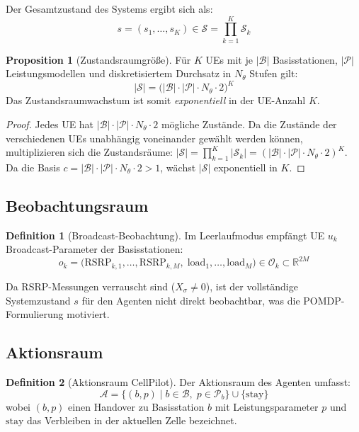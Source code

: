 ﻿\documentclass[a4paper,12pt]{article}
\theoremstyle{definition}
\newtheorem{definition}{Definition}
\newtheorem{proposition}{Proposition}
\begin{document}
Der Gesamtzustand des Systems ergibt sich als:
\[
  s = (s_1, \ldots, s_K) \in \mathcal{S} = \prod_{k=1}^{K} \mathcal{S}_k
\]

\begin{proposition}[Zustandsraumgr\"o\ss{}e]
  F\"ur $K$ UEs mit je $|\mathcal{B}|$ Basisstationen, $|\mathcal{P}|$ Leistungsmodellen
  und diskretisiertem Durchsatz in $N_\theta$ Stufen gilt:
  \[
    |\mathcal{S}| = \bigl(|\mathcal{B}| \cdot |\mathcal{P}| \cdot N_\theta \cdot 2\bigr)^K
  \]
  Das Zustandsraumwachstum ist somit \emph{exponentiell} in der UE-Anzahl $K$.
\end{proposition}

\begin{proof}
  Jedes UE hat $|\mathcal{B}| \cdot |\mathcal{P}| \cdot N_\theta \cdot 2$ m\"ogliche Zust\"ande.
  Da die Zust\"ande der verschiedenen UEs unabh\"angig voneinander gew\"ahlt werden k\"onnen,
  multiplizieren sich die Zustandsr\"aume: $|\mathcal{S}| = \prod_{k=1}^{K} |\mathcal{S}_k|
  = (|\mathcal{B}| \cdot |\mathcal{P}| \cdot N_\theta \cdot 2)^K$.
  Da die Basis $c = |\mathcal{B}| \cdot |\mathcal{P}| \cdot N_\theta \cdot 2 > 1$,
  w\"achst $|\mathcal{S}|$ exponentiell in $K$.
\end{proof}

\subsection{Beobachtungsraum}

\begin{definition}[Broadcast-Beobachtung]
  Im Leerlaufmodus empf\"angt UE $u_k$ Broadcast-Parameter der Basisstationen:
  \[
    o_k = \bigl(\mathrm{RSRP}_{k,1}, \ldots, \mathrm{RSRP}_{k,M},\;
                \mathrm{load}_1, \ldots, \mathrm{load}_M\bigr)
    \in \mathcal{O}_k \subset \mathbb{R}^{2M}
  \]
\end{definition}

Da RSRP-Messungen verrauscht sind ($X_\sigma \neq 0$), ist der vollst\"andige Systemzustand
$s$ f\"ur den Agenten nicht direkt beobachtbar, was die POMDP-Formulierung motiviert.

\subsection{Aktionsraum}

\begin{definition}[Aktionsraum CellPilot]
  Der Aktionsraum des Agenten umfasst:
  \[
    \mathcal{A} = \bigl\{(b, p) \mid b \in \mathcal{B},\; p \in \mathcal{P}_b\bigr\}
    \cup \{\mathrm{stay}\}
  \]
  wobei $(b, p)$ einen Handover zu Basisstation $b$ mit Leistungsparameter $p$
  und $\mathrm{stay}$ das Verbleiben in der aktuellen Zelle bezeichnet.
\end{definition}
\end{document}
